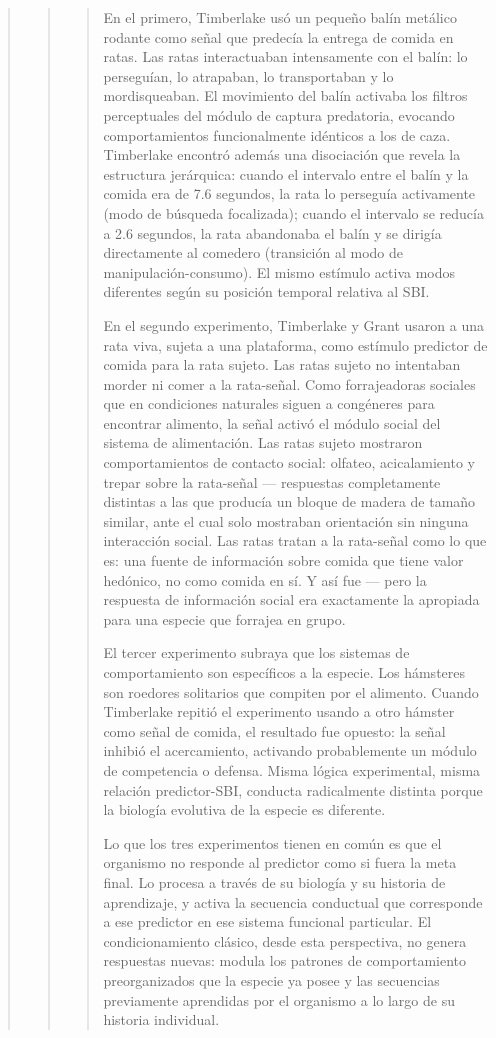 \documentclass[
  letterpaper,
  DIV=11,
  numbers=noendperiod]{scrreprt}
\begin{document}
\begin{tcolorbox}[enhanced jigsaw, arc=.35mm, bottomrule=.15mm, breakable, colback=white, colframe=quarto-callout-note-color-frame, left=2mm, leftrule=.75mm, opacityback=0, rightrule=.15mm, toprule=.15mm]
\begin{quote}
\begin{quote}
\begin{quote}
En el primero, Timberlake usó un pequeño balín metálico rodante como
señal que predecía la entrega de comida en ratas. Las ratas
interactuaban intensamente con el balín: lo perseguían, lo atrapaban, lo
transportaban y lo mordisqueaban. El movimiento del balín activaba los
filtros perceptuales del módulo de captura predatoria, evocando
comportamientos funcionalmente idénticos a los de caza. Timberlake
encontró además una disociación que revela la estructura jerárquica:
cuando el intervalo entre el balín y la comida era de 7.6 segundos, la
rata lo perseguía activamente (modo de búsqueda focalizada); cuando el
intervalo se reducía a 2.6 segundos, la rata abandonaba el balín y se
dirigía directamente al comedero (transición al modo de
manipulación-consumo). El mismo estímulo activa modos diferentes según
su posición temporal relativa al SBI.

En el segundo experimento, Timberlake y Grant usaron a una rata viva,
sujeta a una plataforma, como estímulo predictor de comida para la rata
sujeto. Las ratas sujeto no intentaban morder ni comer a la rata-señal.
Como forrajeadoras sociales que en condiciones naturales siguen a
congéneres para encontrar alimento, la señal activó el módulo social del
sistema de alimentación. Las ratas sujeto mostraron comportamientos de
contacto social: olfateo, acicalamiento y trepar sobre la rata-señal ---
respuestas completamente distintas a las que producía un bloque de
madera de tamaño similar, ante el cual solo mostraban orientación sin
ninguna interacción social. Las ratas tratan a la rata-señal como lo que
es: una fuente de información sobre comida que tiene valor hedónico, no
como comida en sí. Y así fue --- pero la respuesta de información social
era exactamente la apropiada para una especie que forrajea en grupo.

El tercer experimento subraya que los sistemas de comportamiento son
específicos a la especie. Los hámsteres son roedores solitarios que
compiten por el alimento. Cuando Timberlake repitió el experimento
usando a otro hámster como señal de comida, el resultado fue opuesto: la
señal inhibió el acercamiento, activando probablemente un módulo de
competencia o defensa. Misma lógica experimental, misma relación
predictor-SBI, conducta radicalmente distinta porque la biología
evolutiva de la especie es diferente.

Lo que los tres experimentos tienen en común es que el organismo no
responde al predictor como si fuera la meta final. Lo procesa a través
de su biología y su historia de aprendizaje, y activa la secuencia
conductual que corresponde a ese predictor en ese sistema funcional
particular. El condicionamiento clásico, desde esta perspectiva, no
genera respuestas nuevas: modula los patrones de comportamiento
preorganizados que la especie ya posee y las secuencias previamente
aprendidas por el organismo a lo largo de su historia individual.


\end{quote}
\end{quote}
\end{quote}
\end{tcolorbox}
\end{document}
